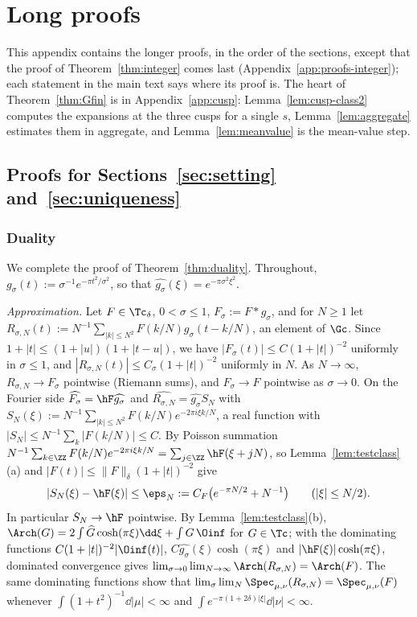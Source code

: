 \section{Long proofs}\label{app:proofs}

This appendix contains the longer proofs, in the order of the sections, except that the proof of Theorem~\ref{thm:integer} comes
last (Appendix~\ref{app:proofs-integer}); each statement in the main text says where its proof is. The heart of Theorem~\ref{thm:Gfin} is in Appendix~\ref{app:cusp}: Lemma~\ref{lem:cusp-class2} computes the
expansions at the three cusps for a single $s$, Lemma~\ref{lem:aggregate} estimates them in aggregate, and Lemma~\ref{lem:meanvalue} is the
mean-value step.

\subsection{Proofs for Sections~\ref{sec:setting} and~\ref{sec:uniqueness}}

\subsubsection{Duality}\label{app:proofs-duality}
We complete the proof of Theorem~\ref{thm:duality}. Throughout, $g_\sigma(t):=\sigma^{-1}e^{-\pi t^2/\sigma^2}$, so that
$\widehat{g_\sigma}(\xi)=e^{-\pi\sigma^2\xi^2}$.

\emph{Approximation.} Let $F\in\Tc_\delta$, $0<\sigma\le1$, $F_\sigma:=F*g_\sigma$, and for $N\ge1$ let
$R_{\sigma,N}(t):=N^{-1}\sum_{|k|\le N^2}F(k/N)g_\sigma(t-k/N)$, an element of $\Gc$. Since $1+|t|\le(1+|u|)(1+|t-u|)$, we have
$|F_\sigma(t)|\le C(1+|t|)^{-2}$ uniformly in $\sigma\le1$, and $|R_{\sigma,N}(t)|\le C_\sigma(1+|t|)^{-2}$ uniformly in $N$. As $N\to\infty$,
$R_{\sigma,N}\to F_\sigma$ pointwise (Riemann sums), and $F_\sigma\to F$ pointwise as $\sigma\to0$. On the Fourier side
$\widehat{F_\sigma}=\hF\widehat{g_\sigma}$ and $\widehat{R_{\sigma,N}}=\widehat{g_\sigma}S_N$ with $S_N(\xi):=N^{-1}\sum_{|k|\le N^2}F(k/N)e^{-2\pi i\xi k/N}$, a real
function with $|S_N|\le N^{-1}\sum_k|F(k/N)|\le C$. By Poisson summation $N^{-1}\sum_{k\in\ZZ}F(k/N)e^{-2\pi i\xi k/N}=\sum_{j\in\ZZ}\hF(\xi+jN)$,
so Lemma~\ref{lem:testclass}(a) and $|F(t)|\le\|F\|_\delta(1+|t|)^{-2}$ give
\begin{equation}\label{eq:alias}
|S_N(\xi)-\hF(\xi)|\le\eps_N:=C_F\big(e^{-\pi N/2}+N^{-1}\big)\qquad(|\xi|\le N/2).
\end{equation}
In particular $S_N\to\hF$ pointwise. By Lemma~\ref{lem:testclass}(b), $\Arch(G)=2\int\widehat G\cosh(\pi\xi)\dd\xi+\int G\,\Oinf$ for
$G\in\Tc$; with the dominating functions $C(1+|t|)^{-2}|\Oinf(t)|$, $C\widehat{g_\sigma}(\xi)\cosh(\pi\xi)$ and $|\hF(\xi)|\cosh(\pi\xi)$, dominated
convergence gives $\lim_{\sigma\to0}\lim_{N\to\infty}\Arch(R_{\sigma,N})=\Arch(F)$. The same dominating functions show that
$\lim_\sigma\lim_N\Spec_{\mu,\nu}(R_{\sigma,N})=\Spec_{\mu,\nu}(F)$ whenever $\int(1+t^2)^{-1}\dd|\mu|<\infty$ and
$\int e^{-\pi(1+2\delta)|\xi|}\dd|\nu|<\infty$.

